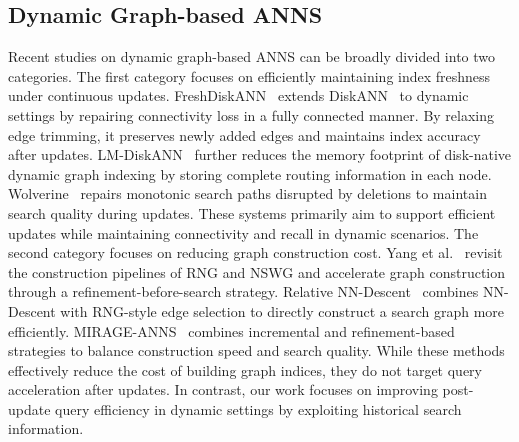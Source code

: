 \subsection{Dynamic Graph-based ANNS}
Recent studies on dynamic graph-based ANNS can be broadly divided into two categories. The first category focuses on efficiently maintaining index freshness under continuous updates. 
FreshDiskANN~\cite{Singh2021} extends DiskANN~\cite{Jayaram2019} to dynamic settings by repairing connectivity loss in a fully connected manner. By relaxing edge trimming, it preserves newly added edges and maintains index accuracy after updates.
LM-DiskANN~\cite{Pan20235987} further reduces the memory footprint of disk-native dynamic graph indexing by storing complete routing information in each node.
Wolverine~\cite{Liu20252268} repairs monotonic search paths disrupted by deletions to maintain search quality during updates. These systems primarily aim to support efficient updates while maintaining connectivity and recall in dynamic scenarios. The second category focuses on reducing graph construction cost. 
Yang et al.~\cite{Yang20251825} revisit the construction pipelines of RNG and NSWG and accelerate graph construction through a refinement-before-search strategy. 
Relative NN-Descent~\cite{Ono20231659} combines NN-Descent with RNG-style edge selection to directly construct a search graph more efficiently. 
MIRAGE-ANNS~\cite{Voruganti2025} combines incremental and refinement-based strategies to balance construction speed and search quality. While these methods effectively reduce the cost of building graph indices, they do not target query acceleration after updates. 
In contrast, our work focuses on improving post-update query efficiency in dynamic settings by exploiting historical search information.